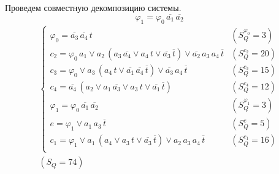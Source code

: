 \documentclass{article}
\begin{document}
\noindent\begin{minipage}{\textwidth}
Проведем совместную декомпозицию системы. \[\varphi_{1} = \varphi_{0}\,\overline{a_1}\,\overline{a_2}\]
\[\begin{matrix}
    \begin{cases}
        \varphi_{0} = \overline{a_3}\,\overline{a_4}\,t & (S_Q^{\varphi_{0}} = 3) \\
        c_2 = \varphi_{0}\,a_1 \lor a_2\,\left(a_3\,\overline{a_4} \lor a_4\,t \lor \overline{a_3}\,\overline{t}\right) \lor \overline{a_2}\,a_3\,a_4\,\overline{t} & (S_Q^{c_2} = 20) \\
        c_3 = \varphi_{0} \lor a_3\,\left(a_4\,t \lor \overline{a_1}\,\overline{a_4}\,\overline{t}\right) \lor \overline{a_3}\,a_4\,\overline{t} & (S_Q^{c_3} = 15) \\
        c_4 = \overline{a_4}\,\left(a_2 \lor a_1\,\overline{a_3} \lor a_3\,t \lor \overline{a_1}\,\overline{t}\right) & (S_Q^{c_4} = 12) \\
        \varphi_{1} = \varphi_{0}\,\overline{a_1}\,\overline{a_2} & (S_Q^{\varphi_{1}} = 3) \\
        e = \varphi_{1} \lor a_1\,a_3\,\overline{t} & (S_Q^{e} = 5) \\
        c_1 = \varphi_{1} \lor a_1\,\left(a_4 \lor a_3\,t \lor \overline{a_3}\,\overline{t}\right) \lor a_2\,a_3\,a_4\,\overline{t} & (S_Q^{c_1} = 16) \\
    \end{cases} \\ (S_Q = 74)
\end{matrix}\] \\ \phantom{0}
\end{minipage}
\end{document}
